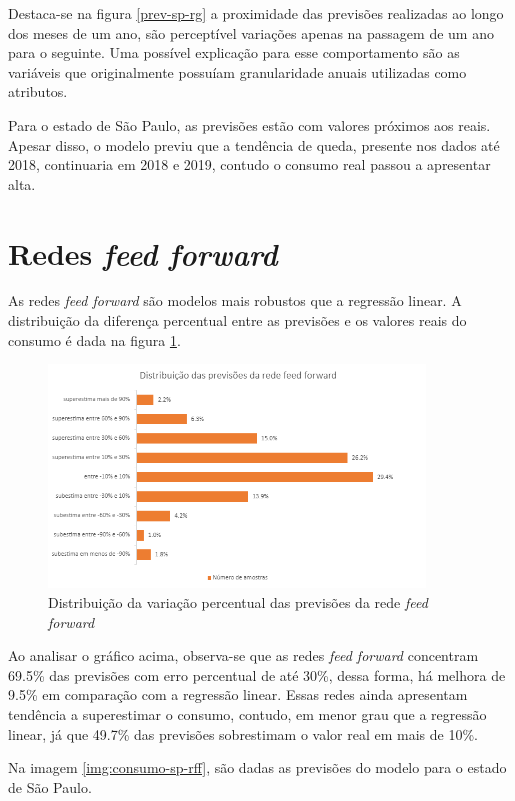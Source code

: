Destaca-se na figura \ref{prev-sp-rg} a proximidade das previsões realizadas 
ao longo dos meses de um ano, são perceptível variações apenas na passagem de um 
ano para o seguinte. Uma possível explicação para esse comportamento são as 
variáveis que originalmente possuíam granularidade anuais utilizadas como atributos.

Para o estado de São Paulo, as previsões estão com valores próximos aos
reais. Apesar disso, o modelo previu que a tendência de queda, presente
nos dados até 2018, continuaria em 2018 e 2019, contudo o consumo real passou 
a apresentar alta.

\section{Redes \textit{feed forward}}

As redes \textit{feed forward} são modelos mais robustos que a regressão linear.
A distribuição da diferença percentual entre as previsões e os valores reais 
do consumo é dada na figura \ref{img:erro-perc-rff}.

\begin{figure}[H]
    \centering
    \includegraphics[width=10cm]{../figuras/graficos/mlp/erro-perc-mlp.png}
    \caption{Distribuição da variação percentual das previsões da rede \textit{feed forward}}
    \label{img:erro-perc-rff}
\end{figure}

Ao analisar o gráfico acima, observa-se que as redes \textit{feed forward}
concentram 69.5\% das previsões com erro percentual de até 30\%, dessa forma, 
há melhora de 9.5\% em comparação com a regressão linear. Essas redes ainda 
apresentam tendência a superestimar o consumo, contudo, em menor grau que 
a regressão linear, já que 49.7\% das previsões sobrestimam  o valor real 
em mais de 10\%.

Na imagem \ref{img:consumo-sp-rff}, são dadas as previsões do modelo para o estado 
de São Paulo.

